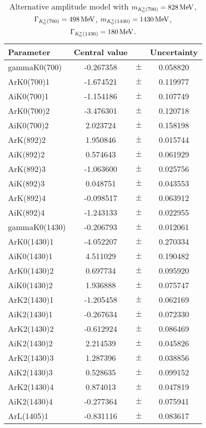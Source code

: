 \clearpage

\begin{table}
\centering
\caption{Alternative amplitude model with $m_{K^*_0(700)} = 828 \text{\,Me\kern -0.1em V}$, $\Gamma_{K^*_0(700)} = 498 \text{\,Me\kern -0.1em V}$, $m_{K^*_0(1430)} = 1430 \text{\,Me\kern -0.1em V}$, $\Gamma_{K^*_0(1430)} = 180 \text{\,Me\kern -0.1em V}$.}
\begin{tiny}
\begin{tabular}{lccc}
\toprule
Parameter & Central value & & Uncertainty\\
\midrule
gammaK0(700) & -0.267358 & $\pm$ & 0.058820 \\
ArK0(700)1 & -1.674521 & $\pm$ & 0.119977 \\
AiK0(700)1 & -1.154186 & $\pm$ & 0.107749 \\
ArK0(700)2 & -3.476301 & $\pm$ & 0.120718 \\
AiK0(700)2 & 2.023724 & $\pm$ & 0.158198 \\
ArK(892)2 & 1.950846 & $\pm$ & 0.015744 \\
AiK(892)2 & 0.574643 & $\pm$ & 0.061929 \\
ArK(892)3 & -1.063600 & $\pm$ & 0.025756 \\
AiK(892)3 & 0.048751 & $\pm$ & 0.043553 \\
ArK(892)4 & -0.098517 & $\pm$ & 0.063912 \\
AiK(892)4 & -1.243133 & $\pm$ & 0.022955 \\
gammaK0(1430) & -0.206793 & $\pm$ & 0.012061 \\
ArK0(1430)1 & -4.052207 & $\pm$ & 0.270334 \\
AiK0(1430)1 & 4.511029 & $\pm$ & 0.190482 \\
ArK0(1430)2 & 0.697734 & $\pm$ & 0.095920 \\
AiK0(1430)2 & 1.936888 & $\pm$ & 0.075747 \\
ArK2(1430)1 & -1.205458 & $\pm$ & 0.062169 \\
AiK2(1430)1 & -0.267634 & $\pm$ & 0.072330 \\
ArK2(1430)2 & -0.612924 & $\pm$ & 0.086469 \\
AiK2(1430)2 & 2.214539 & $\pm$ & 0.045826 \\
ArK2(1430)3 & 1.287396 & $\pm$ & 0.038856 \\
AiK2(1430)3 & 0.528635 & $\pm$ & 0.099152 \\
ArK2(1430)4 & 0.874013 & $\pm$ & 0.047819 \\
AiK2(1430)4 & -0.277364 & $\pm$ & 0.075941 \\
ArL(1405)1 & -0.831116 & $\pm$ & 0.083617 \\

\end{tabular}
\end{tiny}
\end{table}
